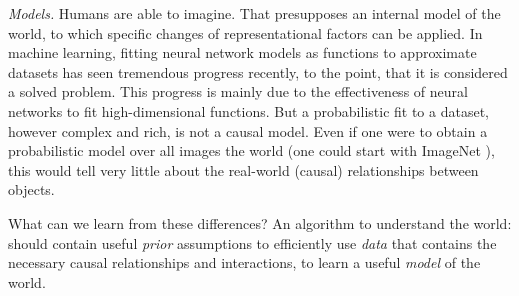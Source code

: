 	\emph{Models.}
		Humans are able to imagine. That presupposes an internal model of the world, to which specific changes of representational factors can be applied.
		In machine learning, fitting neural network models as functions to approximate datasets has seen tremendous progress recently, to the point, that it is considered a solved problem. This progress is mainly due to the effectiveness of neural networks to fit high-dimensional functions. But a probabilistic fit to a dataset, however complex and rich, is not a causal model. Even if one were to obtain a probabilistic model over all images the world (one could start with \eg ImageNet \cite{russakovsky15imagenet}), this would tell very little about the real-world (causal) relationships between objects.

	What can we learn from these differences? An algorithm to understand the world: should contain useful \textit{prior} assumptions to efficiently use \textit{data} that contains the necessary causal relationships and interactions, to learn a useful \textit{model} of the world.

%

\newpage
